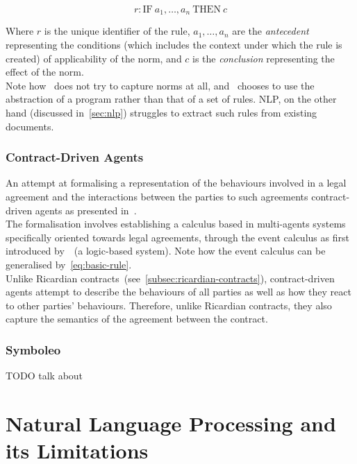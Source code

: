 \begin{equation}
    \label{eq:basic-rule}
    r: \text{IF} \  a_{1}, \dots ,a_n \ \text{THEN} \ c
\end{equation}

Where $r$ is the unique identifier of the rule, $a_1, \dots, a_n $ are the \emph{antecedent} representing the conditions (which includes the context under which the rule is created) of applicability of the norm, and $c$ is the \emph{conclusion} representing the effect of the norm.\\

Note how~ does not try to capture norms at all, and~ chooses to use the abstraction of a program rather than that of a set of rules.
NLP, on the other hand (discussed in~\autoref{sec:nlp}) struggles to extract such rules from existing documents.

\subsubsection{Contract-Driven Agents}\label{subsubsec:contract-driven-agents}

An attempt at formalising a representation of the behaviours involved in a legal agreement and the interactions between the parties to such agreements contract-driven agents as presented in~\cite{knottenbeltContractDriven}.\\

The formalisation involves establishing a calculus based in multi-agents systems specifically oriented towards legal agreements, through the event calculus as first introduced by~\cite{kowalski1989logicEventBased}~(a logic-based system).
Note how the event calculus can be generalised by~\autoref{eq:basic-rule}.\\

Unlike Ricardian contracts~(see~\autoref{subsec:ricardian-contracts}), contract-driven agents attempt to describe the behaviours of all parties as well as how they react to other parties' behaviours.
Therefore, unlike Ricardian contracts, they also capture the semantics of the agreement between the contract.

\subsubsection{Symboleo}

TODO talk about~\cite{symboleo2020}


\section{Natural Language Processing and its Limitations}\label{sec:nlp}


